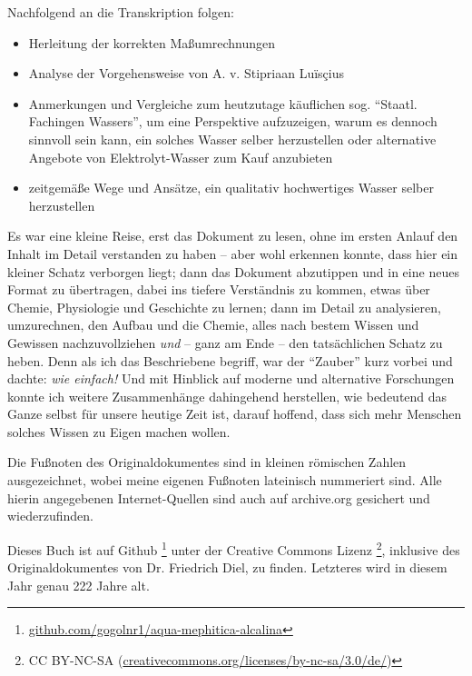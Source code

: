 \documentclass[a5paper,fontsize=10pt]{memoir}
\begin{document}
\setcounter{page}{1}

Nachfolgend an die Transkription folgen:
\begin{itemize}
\item Herleitung der korrekten Maßumrechnungen
\item Analyse der Vorgehensweise von A. v. Stipriaan Luïsçius
\item Anmerkungen und Vergleiche
zum heutzutage käuflichen sog. ``Staatl. Fachingen Wassers'',
um eine Perspektive aufzuzeigen,
warum es dennoch sinnvoll sein kann,
ein solches Wasser selber herzustellen oder
alternative Angebote von Elektrolyt-Wasser zum Kauf anzubieten
\item zeitgemäße Wege und Ansätze, ein qualitativ hochwertiges Wasser selber herzustellen
\end{itemize}

Es war eine kleine Reise,
erst das Dokument zu lesen,
ohne im ersten Anlauf den Inhalt im Detail verstanden zu haben --
aber wohl erkennen konnte,
dass hier ein kleiner Schatz verborgen liegt;
dann das Dokument abzutippen
und in eine neues Format zu übertragen,
dabei ins tiefere Verständnis zu kommen,
etwas über Chemie, Physiologie und Geschichte zu lernen;
dann im Detail zu analysieren, umzurechnen,
den Aufbau und die Chemie,
alles nach bestem Wissen und Gewissen nachzuvollziehen
\emph{und} -- ganz am Ende -- den tatsächlichen Schatz zu heben.
Denn als ich das Beschriebene begriff,
war der ``Zauber'' kurz vorbei
und dachte: \emph{wie einfach!}
Und mit Hinblick auf moderne und alternative Forschungen
konnte ich weitere Zusammenhänge dahingehend herstellen,
wie bedeutend das Ganze selbst für unsere heutige Zeit ist,
darauf hoffend, dass sich mehr Menschen
solches Wissen zu Eigen machen wollen.

Die Fußnoten des Originaldokumentes
sind in kleinen römischen Zahlen ausgezeichnet,
wobei meine eigenen Fußnoten lateinisch nummeriert sind.
Alle hierin angegebenen Internet-Quellen
sind auch auf archive.org gesichert und wiederzufinden. 

Dieses Buch ist auf Github%
\footnote{\href{https://github.com/gogolnr1/aqua-mephitica-alcalina}{github.com/gogolnr1/aqua-mephitica-alcalina}}
unter der Creative Commons Lizenz%
\footnote{CC BY-NC-SA (\href{https://creativecommons.org/licenses/by-nc-sa/3.0/de/}{creativecommons.org/licenses/by-nc-sa/3.0/de/})},
inklusive des Originaldokumentes von Dr. Friedrich Diel,
zu finden.
Letzteres wird in diesem Jahr genau 222 Jahre alt.
%
\fancyhead{}
\strut%
%
\checkoddpage\ifoddpage%
  \newpage\strut%
  \fi
\end{document}
